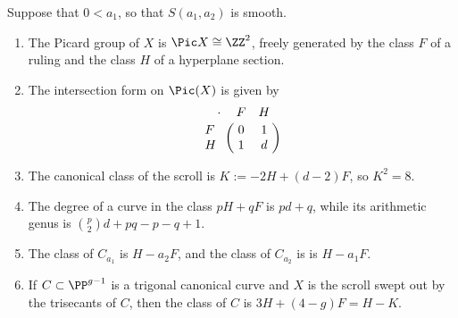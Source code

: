 \begin{theorem}\label{pic of scroll}
Suppose that $0<a_{1}$, so that $S(a_{1},a_{2})$ is smooth.

\begin{enumerate}

\item The Picard group of $X$ is $\Pic X \cong \ZZ^2$, freely generated by  the class $F$ of a ruling and the class $H$ of a  hyperplane section. 
\item The
intersection form on $\Pic(X)$ is given by
$$
\bordermatrix{\kern 10pt\cdot&F&H\cr
F&0&1\cr
H&1&d
}
$$

\item The canonical class of the scroll is $K := -2H +(d-2)F$, so $K^2 = 8$.

\item The degree of a curve in the class $pH+qF$ is $pd+q$, while its arithmetic genus is
${p\choose 2}d+pq-p-q+1$.

\item The class of $C_{a_1}$
is $H-a_2F$, and the class of $C_{a_2}$ is 
is $H-a_1F$. 
\item If $C \subset \PP^{g-1}$ is a trigonal canonical curve and $X$ is the scroll swept out by the trisecants of $C$, then the class of $C$ is $3H+(4-g)F = H-K$. 
\end{enumerate}
\end{theorem}

